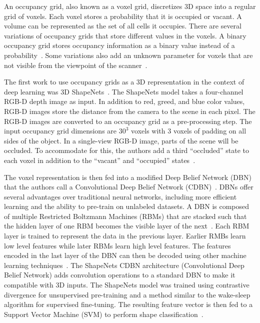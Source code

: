 An occupancy grid, also known as a voxel grid, discretizes 3D space into a regular grid of voxels. Each voxel stores a probability that it is occupied or vacant. A volume can be represented as the set of all cells it occupies. There are several variations of occupancy grids that store different values in the voxels. A binary occupancy grid stores occupancy information as a binary value instead of a probability~\cite{Konolige1997}. Some variations also add an unknown parameter for voxels that are not visible from the viewpoint of the scanner~\cite{Xiao2020}.

The first work to use occupancy grids as a 3D representation in the context of deep learning was 3D ShapeNets~\cite{Wu2015}. The ShapeNets model takes a four-channel RGB-D depth image as input. In addition to red, greed, and blue color values, RGB-D images store the distance from the camera to the scene in each pixel. The RGB-D images are converted to an occupancy grid as a pre-processing step. The input occupancy grid dimensions are $30^3$ voxels with 3 voxels of padding on all sides of the object. In a single-view RGB-D image, parts of the scene will be occluded. To accommodate for this, the authors add a third ``occluded'' state to each voxel in addition to the ``vacant'' and ``occupied'' states~\cite{Wu2015}.

The voxel representation is then fed into a modified Deep Belief Network (DBN) that the authors call a Convolutional Deep Belief Network (CDBN)~\cite{Wu2015}. DBNs offer several advantages over traditional neural networks, including more efficient learning and the ability to pre-train on unlabeled datasets. A DBN is composed of multiple Restricted Boltzmann Machines (RBMs) that are stacked such that the hidden layer of one RBM becomes the visible layer of the next~\cite{Aljabery2020}. Each RBM layer is trained to represent the data in the previous layer. Earlier RMBs learn low level features while later RBMs learn high level features. The features encoded in the last layer of the DBN can then be decoded using other machine learning techniques~\cite{McAfee2008}. The ShapeNets CDBN architecture (Convolutional Deep Belief Network) adds convolution operations to a standard DBN to make it compatible with 3D inputs. The ShapeNets model was trained using contrastive divergence for unsupervised pre-training and a method similar to the wake-sleep algorithm for supervised fine-tuning. The resulting feature vector is then fed to a Support Vector Machine (SVM) to perform shape classification~\cite{Wu2015}.

